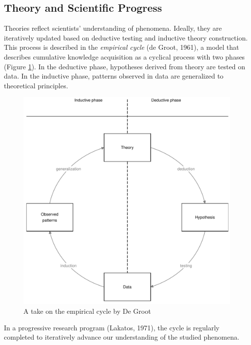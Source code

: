 \documentclass[
  man]{apa6}
\begin{document}
\subsection{Theory and Scientific Progress}\label{theory-and-scientific-progress}

Theories reflect scientists' understanding of phenomena.
Ideally, they are iteratively updated based on deductive testing and inductive theory construction.
This process is described in the \emph{empirical cycle} (de Groot, 1961),
a model that describes cumulative knowledge acquisition as a cyclical process with two phases (Figure \ref{fig:figec}).
In the deductive phase, hypotheses derived from theory are tested on data. In the inductive phase, patterns observed in data are generalized to theoretical principles.

\begin{figure}
\centering
\includegraphics{empirical_cycle.pdf}
\caption{\label{fig:figec}A take on the empirical cycle by De Groot}
\end{figure}

In a progressive research program (Lakatos, 1971),
the cycle is regularly completed to iteratively advance our understanding of the studied phenomena.
\end{document}
